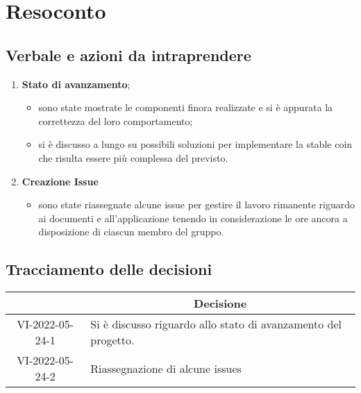 \section{Resoconto}
\subsection{Verbale e azioni da intraprendere}

\begin{enumerate}
	\item \textbf{Stato di avanzamento};
	\begin{itemize}
		\item sono state mostrate le componenti finora realizzate e si è appurata la correttezza del loro comportamento;
		\item si è discusso a lungo su possibili soluzioni per implementare la stable coin\glo{} che risulta essere più complessa del previsto.
	\end{itemize}
	\item \textbf{Creazione Issue}
	\begin{itemize}
		\item sono state riassegnate alcune issue per gestire il lavoro rimanente riguardo ai documenti e all'applicazione tenendo in considerazione le ore ancora a disposizione di ciascun membro del gruppo.
	\end{itemize}
\end{enumerate}

\pagebreak

\subsection{Tracciamento delle decisioni}

\begin{table}[H]
	\centering
	\renewcommand{\arraystretch}{1.8}
	\begin{tabular}{c | p{10cm}}
		\rowcolor[HTML]{125E28}
		\multicolumn{1}{c}{\color[HTML]{FFFFFF} \textbf{ID}} &
		\multicolumn{1}{c}{\color[HTML]{FFFFFF} \textbf{Decisione}} \\
		\hline
		VI-2022-05-24-1 & Si è discusso riguardo allo stato di avanzamento del progetto. \\ \hline
		VI-2022-05-24-2 & Riassegnazione di alcune issues\\ \hline

	\end{tabular}
\end{table}